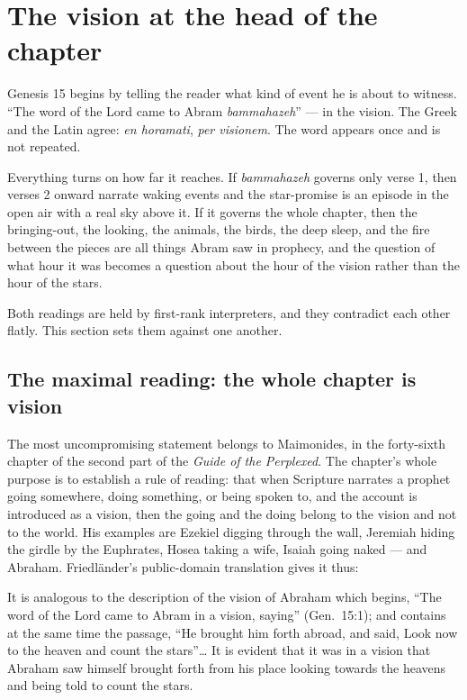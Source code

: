 \section{The vision at the head of the chapter}

Genesis 15 begins by telling the reader what kind of event he is about to
witness. ``The word of the Lord came to Abram \textit{bammahazeh}'' --- in the
vision. The Greek and the Latin agree: \textit{en horamati}, \textit{per
visionem}. The word appears once and is not repeated.

Everything turns on how far it reaches. If \textit{bammahazeh} governs only
verse 1, then verses 2 onward narrate waking events and the star-promise is an
episode in the open air with a real sky above it. If it governs the whole
chapter, then the bringing-out, the looking, the animals, the birds, the deep
sleep, and the fire between the pieces are all things Abram saw in prophecy, and
the question of what hour it was becomes a question about the hour of the vision
rather than the hour of the stars.

Both readings are held by first-rank interpreters, and they contradict each
other flatly. This section sets them against one another.

\subsection{The maximal reading: the whole chapter is vision}

The most uncompromising statement belongs to Maimonides, in the forty-sixth
chapter of the second part of the \textit{Guide of the Perplexed}. The chapter's
whole purpose is to establish a rule of reading: that when Scripture narrates a
prophet going somewhere, doing something, or being spoken to, and the account is
introduced as a vision, then the going and the doing belong to the vision and
not to the world. His examples are Ezekiel digging through the wall, Jeremiah
hiding the girdle by the Euphrates, Hosea taking a wife, Isaiah going naked ---
and Abraham. Friedl\"ander's public-domain translation gives it thus:

\begin{studyframe}
It is analogous to the description of the vision of Abraham which begins, ``The
word of the Lord came to Abram in a vision, saying'' (Gen.~15:1); and contains
at the same time the passage, ``He brought him forth abroad, and said, Look now
to the heaven and count the stars''\dots{} It is evident that it was in a vision
that Abraham saw himself brought forth from his place looking towards the
heavens and being told to count the stars.
\end{studyframe}

